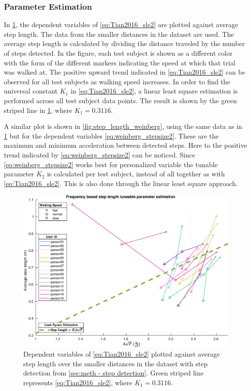 \subsubsection{Parameter Estimation}
\label{sec:results-step_length-parameter_estimation}
In \cref{fig:step_length_tian}, the dependent variables of \eqref{eq:Tian2016_sle2} are plotted against average step length. The data from the smaller distances in the \citet{Vezocnik2019} dataset are used. The average step length is calculated by dividing the distance traveled by the number of steps detected. In the figure, each test subject is shown as a different color with the form of the different markers indicating the speed at which that trial was walked at. The positive upward trend indicated in \eqref{eq:Tian2016_sle2} can be observed for all test subjects as walking speed increases. In order to find the universal constant $K_1$ in \eqref{eq:Tian2016_sle2}, a linear least square estimation is performed across all test subject data points. The result is shown by the green striped line in \cref{fig:step_length_tian}, where $ K_1 = 0.3116$. \par 

A similar plot is shown in \cref{fig:step_length_weinberg}, using the same data as in \cref{fig:step_length_tian} but for the  dependent variables \eqref{eq:weinberg_stepsize2}. These are the maximum and minimum acceleration between detected steps. Here to the positive trend indicated by \eqref{eq:weinberg_stepsize2} can be noticed. Since \eqref{eq:weinberg_stepsize2} works best for personalized variable the tunable parameter $ K_2 $ is calculated per test subject, instead of all together as with \eqref{eq:Tian2016_sle2}. This is also done through the linear least square approach.

	\begin{figure}[H]
	\centering
	\includegraphics[width=0.8\linewidth]{images/20201128_1304_}
	\setlength{\belowcaptionskip}{-10pt}
	\caption{Dependent variables of \eqref{eq:Tian2016_sle2} plotted against average step length over the smaller distances in the \citet{Vezocnik2019} dataset with step detection from \cref{sec:meth - step detection}. Green striped line represents \eqref{eq:Tian2016_sle2}, where $ K_1 = 0.3116$.  }
	\label{fig:step_length_tian}
	\end{figure}

